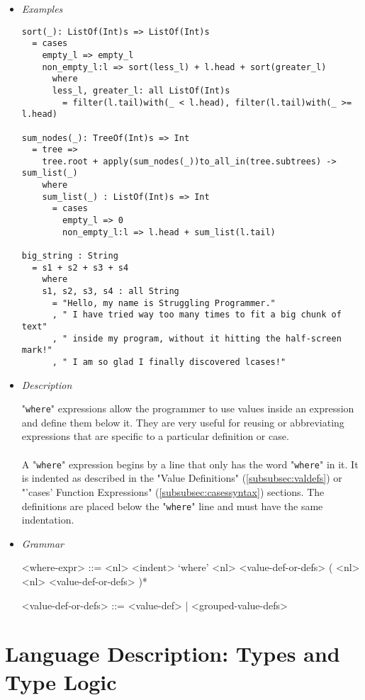 \documentclass{article}
\begin{document}
\begin{itemize}

\item \textit{Examples}
\begin{verbatim}
sort(_): ListOf(Int)s => ListOf(Int)s
  = cases
    empty_l => empty_l
    non_empty_l:l => sort(less_l) + l.head + sort(greater_l)
      where
      less_l, greater_l: all ListOf(Int)s
        = filter(l.tail)with(_ < l.head), filter(l.tail)with(_ >= l.head)

sum_nodes(_): TreeOf(Int)s => Int
  = tree =>
    tree.root + apply(sum_nodes(_))to_all_in(tree.subtrees) -> sum_list(_)
    where
    sum_list(_) : ListOf(Int)s => Int
      = cases
        empty_l => 0
        non_empty_l:l => l.head + sum_list(l.tail)

big_string : String
  = s1 + s2 + s3 + s4
    where
    s1, s2, s3, s4 : all String
      = "Hello, my name is Struggling Programmer."
      , " I have tried way too many times to fit a big chunk of text"
      , " inside my program, without it hitting the half-screen mark!"
      , " I am so glad I finally discovered lcases!"
\end{verbatim}

\item \textit{Description}

"\verb|where|" expressions allow the programmer to use values inside an
expression and define them below it. They are very useful for reusing or
abbreviating expressions that are specific to a particular definition or case.
\\\\
A "\verb|where|" expression begins by a line that only has the word
"\verb|where|" in it. It is indented as described in the "Value Definitions"
(\ref{subsubsec:valdefs}) or "'cases' Function Expressions"
(\ref{subsubsec:casessyntax}) sections.  The definitions are placed below the
"\verb|where|" line and must have the same indentation.

\item \textit{Grammar}
\begin{grammar}
<where-expr> ::=
<nl> <indent> `where'
<nl> <value-def-or-defs> ( <nl> <nl> <value-def-or-defs> )*

<value-def-or-defs> ::= <value-def> | <grouped-value-defs>
\end{grammar}

\end{itemize}

\newpage

\section{Language Description: Types and Type Logic}
\end{document}
